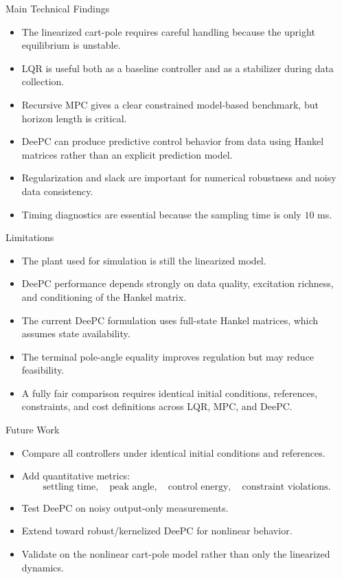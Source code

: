 \documentclass[aspectratio=169,11pt]{beamer}
\begin{document}
\begin{frame}{Main Technical Findings}
    \begin{itemize}
        \item The linearized cart-pole requires careful handling because the upright equilibrium is unstable.
        \item LQR is useful both as a baseline controller and as a stabilizer during data collection.
        \item Recursive MPC gives a clear constrained model-based benchmark, but horizon length is critical.
        \item DeePC can produce predictive control behavior from data using Hankel matrices rather than an explicit prediction model.
        \item Regularization and slack are important for numerical robustness and noisy data consistency.
        \item Timing diagnostics are essential because the sampling time is only $10$ ms.
    \end{itemize}
\end{frame}

\begin{frame}{Limitations}
    \begin{itemize}
        \item The plant used for simulation is still the linearized model.
        \item DeePC performance depends strongly on data quality, excitation richness, and conditioning of the Hankel matrix.
        \item The current DeePC formulation uses full-state Hankel matrices, which assumes state availability.
        \item The terminal pole-angle equality improves regulation but may reduce feasibility.
        \item A fully fair comparison requires identical initial conditions, references, constraints, and cost definitions across LQR, MPC, and DeePC.
    \end{itemize}
\end{frame}

\begin{frame}{Future Work}
    \begin{itemize}
        \item Compare all controllers under identical initial conditions and references.
        \item Add quantitative metrics:
        \[
        \text{settling time},\quad
        \text{peak angle},\quad
        \text{control energy},\quad
        \text{constraint violations}.
        \]
        \item Test DeePC on noisy output-only measurements.
        \item Extend toward robust/kernelized DeePC for nonlinear behavior.
        \item Validate on the nonlinear cart-pole model rather than only the linearized dynamics.
    \end{itemize}
\end{frame}
\end{document}
